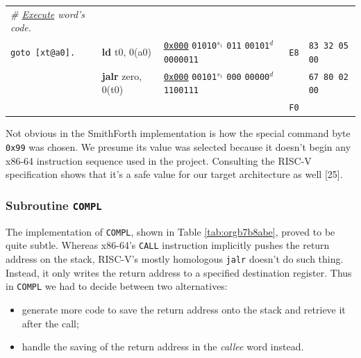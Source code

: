 \documentclass[a4paper,12pt,final]{article}
\makeatletter
\newcommand{\citeprocitem}[2]{\hyper@linkstart{cite}{citeproc_bib_item_#1}#2\hyper@linkend}
\makeatother
\begin{document}
\begin{table}[!htbp]
\begin{adjustwidth}{-1cm}{-1cm}
\begin{center}
\begin{tabular}{l|ll|l|l}
\hspace{1em} \emph{\# \uline{Execute} word's code.} &  &  &  & \\[0pt]
\hspace{1em} \texttt{goto [xt@a0].} & \textbf{ld} t0, 0(a0) & \uline{\texttt{0x000}}                    \texttt{01010}​\(^{s_{1}}\) \texttt{011} \texttt{00101}​\(^{d}\)  \texttt{0000011} & \texttt{E8} & \texttt{83 32 05 00}\\[0pt]
\hspace{1em} & \textbf{jalr} zero, 0(t0) & \uline{\texttt{0x000}}                    \texttt{00101}​\(^{s_{1}}\) \texttt{000} \texttt{00000}​\(^{d}\)  \texttt{1100111} &  & \texttt{67 80 02 00}\\[0pt]
 &  &  & \texttt{F0} & \\[0pt]
\end{tabular}

\end{center}
\normalsize \end{adjustwidth} \end{table} \vspace{0}

Not obvious in the SmithForth implementation is how the special
command byte \texttt{0x99} was chosen.  We presume its value was selected
because it doesn't begin any x86-64 instruction sequence used in the
project.  Consulting the RISC-V specification shows that it's a safe
value for our target architecture as well \citeprocitem{25}{[25]}.

\subsubsection{Subroutine \texttt{COMPL}}
\label{sec:org32a4cf0}

The implementation of \texttt{COMPL}, shown in Table \ref{tab:orgb7b8abe},
proved to be quite subtle.  Whereas x86-64's \texttt{CALL} instruction
implicitly pushes the return address on the stack, RISC-V's mostly
homologous \texttt{jalr} doesn't do such thing.  Instead, it only writes the
return address to a specified destination register.  Thus in \texttt{COMPL}
we had to decide between two alternatives:
\begin{itemize}
\item generate more code to save the return address onto the stack and
retrieve it after the call;
\item handle the saving of the return address in the \emph{callee} word
instead.
\end{itemize}
\end{document}
